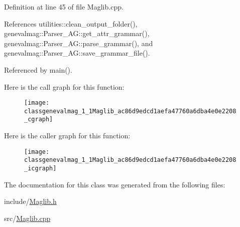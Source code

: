 Definition at line 45 of file Maglib.cpp.



References utilities::clean\_\-output\_\-folder(), genevalmag::Parser\_\-AG::get\_\-attr\_\-grammar(), genevalmag::Parser\_\-AG::parse\_\-grammar(), and genevalmag::Parser\_\-AG::save\_\-grammar\_\-file().



Referenced by main().



Here is the call graph for this function:\nopagebreak
\begin{figure}[H]
\begin{center}
\leavevmode
\texttt{[image: classgenevalmag\_1\_1Maglib\_ac86d9edcd1aefa47760a6dba4e0e2208\_cgraph]}
\end{center}
\end{figure}




Here is the caller graph for this function:\nopagebreak
\begin{figure}[H]
\begin{center}
\leavevmode
\texttt{[image: classgenevalmag\_1\_1Maglib\_ac86d9edcd1aefa47760a6dba4e0e2208\_icgraph]}
\end{center}
\end{figure}




The documentation for this class was generated from the following files:\begin{DoxyCompactItemize}
\item 
include/\hyperlink{Maglib_8h}{Maglib.h}\item 
src/\hyperlink{Maglib_8cpp}{Maglib.cpp}\end{DoxyCompactItemize}
